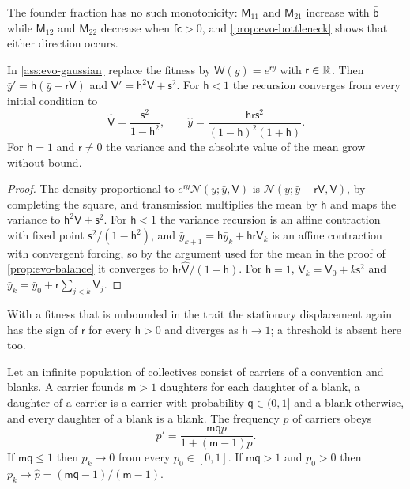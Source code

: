 The founder fraction has no such monotonicity: $\mathsf M_{11}$ and $\mathsf M_{21}$ increase with $\bar{\mathsf b}$ while $\mathsf M_{12}$ and $\mathsf M_{22}$ decrease when $\mathsf f\mathsf c>0$, and \cref{prop:evo-bottleneck} shows that either direction occurs.

\begin{proposition}\label{prop:evo-directional}
In \cref{ass:evo-gaussian} replace the fitness by $\mathsf W(y)=e^{\mathsf ry}$ with $\mathsf r\in\mathbb{R}$. Then $\bar y'=\mathsf h(\bar y+\mathsf r\mathsf V)$ and $\mathsf V'=\mathsf h^2\mathsf V+\mathsf s^2$. For $\mathsf h<1$ the recursion converges from every initial condition to
\begin{equation}\label{eq:evo-directional}
\hat{\mathsf V}=\frac{\mathsf s^2}{1-\mathsf h^2},\qquad\hat y=\frac{\mathsf h\mathsf r\mathsf s^2}{(1-\mathsf h)^2(1+\mathsf h)}.
\end{equation}
For $\mathsf h=1$ and $\mathsf r\ne0$ the variance and the absolute value of the mean grow without bound.
\end{proposition}

\begin{proof}
The density proportional to $e^{\mathsf ry}\mathcal N(y;\bar y,\mathsf V)$ is $\mathcal N(y;\bar y+\mathsf r\mathsf V,\mathsf V)$, by completing the square, and transmission multiplies the mean by $\mathsf h$ and maps the variance to $\mathsf h^2\mathsf V+\mathsf s^2$. For $\mathsf h<1$ the variance recursion is an affine contraction with fixed point $\mathsf s^2/(1-\mathsf h^2)$, and $\bar y_{k+1}=\mathsf h\bar y_k+\mathsf h\mathsf r\mathsf V_k$ is an affine contraction with convergent forcing, so by the argument used for the mean in the proof of \cref{prop:evo-balance} it converges to $\mathsf h\mathsf r\hat{\mathsf V}/(1-\mathsf h)$. For $\mathsf h=1$, $\mathsf V_k=\mathsf V_0+k\mathsf s^2$ and $\bar y_k=\bar y_0+\mathsf r\sum_{j<k}\mathsf V_j$.
\end{proof}

With a fitness that is unbounded in the trait the stationary displacement again has the sign of $\mathsf r$ for every $\mathsf h>0$ and diverges as $\mathsf h\to1$; a threshold is absent here too.

\begin{proposition}\label{prop:evo-two-type}
Let an infinite population of collectives consist of carriers of a convention and blanks. A carrier founds $\mathsf m>1$ daughters for each daughter of a blank, a daughter of a carrier is a carrier with probability $\mathsf q\in(0,1]$ and a blank otherwise, and every daughter of a blank is a blank. The frequency $p$ of carriers obeys
\begin{equation}\label{eq:evo-two-type}
p'=\frac{\mathsf m\mathsf qp}{1+(\mathsf m-1)p}.
\end{equation}
If $\mathsf m\mathsf q\le1$ then $p_k\to0$ from every $p_0\in[0,1]$. If $\mathsf m\mathsf q>1$ and $p_0>0$ then $p_k\to\hat p=(\mathsf m\mathsf q-1)/(\mathsf m-1)$.
\end{proposition}

